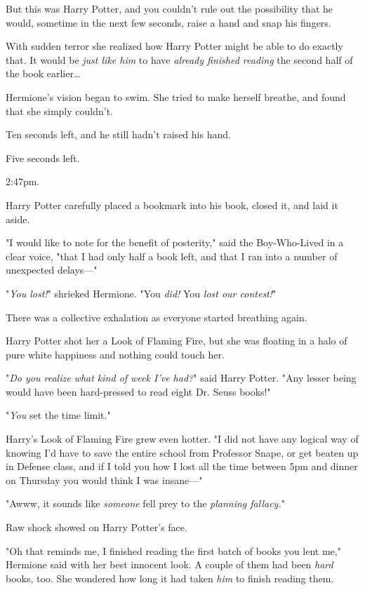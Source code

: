 But this was Harry Potter, and you couldn't rule out the possibility that he 
would, sometime in the next few seconds, raise a hand and snap his fingers.

With sudden terror she realized how Harry Potter might be able to do exactly 
that. It would be \emph{just like him} to have \emph{already finished reading} 
the second half of the book earlier{\ldots}

Hermione's vision began to swim. She tried to make herself breathe, and found 
that she simply couldn't.

Ten seconds left, and he still hadn't raised his hand.

Five seconds left.

2:47pm.

Harry Potter carefully placed a bookmark into his book, closed it, and laid it 
aside.

"I would like to note for the benefit of posterity," said the Boy-Who-Lived in 
a clear voice, "that I had only half a book left, and that I ran into a number 
of unexpected delays---"

"\emph{You lost!}" shrieked Hermione. "You \emph{did!} You \emph{lost our 
contest!}"

There was a collective exhalation as everyone started breathing again.

Harry Potter shot her a Look of Flaming Fire, but she was floating in a halo of 
pure white happiness and nothing could touch her.

"\emph{Do you realize what kind of week I've had?}" said Harry Potter. "Any 
lesser being would have been hard-pressed to read eight Dr. Seuss books!"

"\emph{You} set the time limit."

Harry's Look of Flaming Fire grew even hotter. "I did not have any logical way 
of knowing I'd have to save the entire school from Professor Snape, or get 
beaten up in Defense class, and if I told you how I lost all the time between 
5pm and dinner on Thursday you would think I was insane---"

"Awww, it sounds like \emph{someone} fell prey to the \emph{planning fallacy.}"

Raw shock showed on Harry Potter's face.

"Oh that reminds me, I finished reading the first batch of books you lent me," 
Hermione said with her best innocent look. A couple of them had been 
\emph{hard} books, too. She wondered how long it had taken \emph{him} to finish 
reading them.

